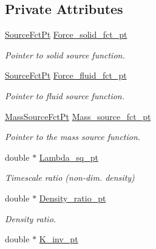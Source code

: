 \subsection*{Private Attributes}
\begin{DoxyCompactItemize}
\item 
\hyperlink{classoomph_1_1PoroelasticityEquations_a234bc29fbd4c3255ef903a3cb5f6361f}{Source\+Fct\+Pt} \hyperlink{classoomph_1_1PoroelasticityEquations_a34751c6bb84f239c56b504eec3cae3a0}{Force\+\_\+solid\+\_\+fct\+\_\+pt}
\begin{DoxyCompactList}\small\item\em Pointer to solid source function. \end{DoxyCompactList}\item 
\hyperlink{classoomph_1_1PoroelasticityEquations_a234bc29fbd4c3255ef903a3cb5f6361f}{Source\+Fct\+Pt} \hyperlink{classoomph_1_1PoroelasticityEquations_a0eddc37ef5d34554635e3d348fc00b4e}{Force\+\_\+fluid\+\_\+fct\+\_\+pt}
\begin{DoxyCompactList}\small\item\em Pointer to fluid source function. \end{DoxyCompactList}\item 
\hyperlink{classoomph_1_1PoroelasticityEquations_a8edb2644708db2f2ae03254ea3143262}{Mass\+Source\+Fct\+Pt} \hyperlink{classoomph_1_1PoroelasticityEquations_a15153a0c51a6537c157793c6ab2308b9}{Mass\+\_\+source\+\_\+fct\+\_\+pt}
\begin{DoxyCompactList}\small\item\em Pointer to the mass source function. \end{DoxyCompactList}\item 
double $\ast$ \hyperlink{classoomph_1_1PoroelasticityEquations_af0a463020f0fbcb27345ba726522523f}{Lambda\+\_\+sq\+\_\+pt}
\begin{DoxyCompactList}\small\item\em Timescale ratio (non-\/dim. density) \end{DoxyCompactList}\item 
double $\ast$ \hyperlink{classoomph_1_1PoroelasticityEquations_ac410f6d79b98f0c58480cf732206a349}{Density\+\_\+ratio\+\_\+pt}
\begin{DoxyCompactList}\small\item\em Density ratio. \end{DoxyCompactList}\item 
double $\ast$ \hyperlink{classoomph_1_1PoroelasticityEquations_ae686ea7c8589338ea0a6246fed8dac6f}{K\+\_\+inv\+\_\+pt}

\end{DoxyCompactItemize}
